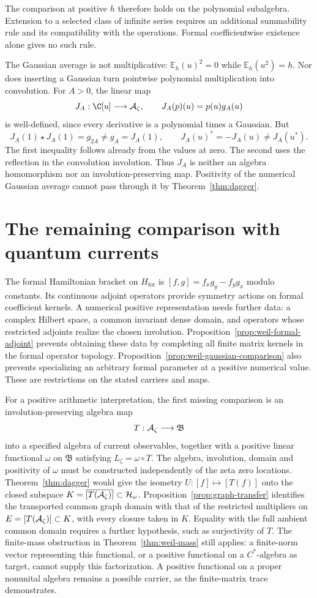 The comparison at positive $h$ therefore holds on the polynomial
subalgebra.  Extension to a selected class of infinite series requires
an additional summability rule and its compatibility with the operations.
Formal coefficientwise existence alone gives no such rule.

The Gaussian average is not multiplicative:
$\mathbb E_h(u)^2=0$ while $\mathbb E_h(u^2)=h$.
Nor does inserting a Gaussian turn pointwise polynomial multiplication
into convolution.  For $A>0$, the linear map
\[
 J_A:\C[u]\longrightarrow\A_\zeta,\qquad J_A(p)(u)=p(u)g_A(u)
\]
is well-defined, since every derivative is a polynomial times a Gaussian.
But
\[
 J_A(1)\star J_A(1)=g_{2A}\ne g_A=J_A(1),
 \qquad J_A(u)^*=-J_A(u)\ne J_A(u^*).
\]
The first inequality follows already from the values at zero.
The second uses the reflection in the convolution involution.
Thus $J_A$ is neither an algebra homomorphism nor an involution-preserving
map.  Positivity of the numerical Gaussian average cannot pass through
it by Theorem~\ref{thm:dagger}.

\section{The remaining comparison with quantum currents}
\label{sec:weil-current-comparison}

The formal Hamiltonian bracket on $H_{\mathrm{for}}$ is
$[f,g]=f_xg_y-f_yg_x$ modulo constants.
Its continuous adjoint operators provide symmetry actions on formal
coefficient kernels.  A numerical positive representation needs further
data: a complex Hilbert space, a common invariant dense domain, and
operators whose restricted adjoints realize the chosen involution.
Proposition~\ref{prop:weil-formal-adjoint} prevents obtaining these data
by completing all finite matrix kernels in the formal operator topology.
Proposition~\ref{prop:weil-gaussian-comparison} also prevents specializing
an arbitrary formal parameter at a positive numerical value.
These are restrictions on the stated carriers and maps.

For a positive arithmetic interpretation, the first missing comparison
is an involution-preserving algebra map
\[
 T:\mathcal A_\zeta\longrightarrow\mathfrak B
\]
into a specified algebra of current observables, together with a positive
linear functional $\omega$ on $\mathfrak B$ satisfying
$L_\zeta=\omega\circ T$.
The algebra, involution, domain and positivity of $\omega$ must be
constructed independently of the zeta zero locations.
Theorem~\ref{thm:dagger} would give the isometry
$U:[f]\mapsto[T(f)]$ onto the closed subspace
$K=\overline{[T(\mathcal A_\zeta)]}\subset\mathcal H_\omega$.
Proposition~\ref{prop:graph-transfer} identifies the transported common
graph domain with that of the restricted multipliers on
$E=[T(\mathcal A_\zeta)]\subset K$, with every closure taken in $K$.
Equality with the full ambient common domain requires a further
hypothesis, such as surjectivity of $T$.
The finite-mass obstruction in Theorem~\ref{thm:weil-mass} still applies:
a finite-norm vector representing this functional, or a positive
functional on a $C^*$-algebra as target, cannot supply this factorization.
A positive functional on a proper nonunital algebra remains a possible
carrier, as the finite-matrix trace demonstrates.

